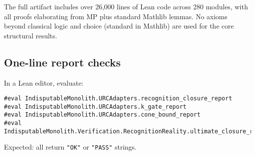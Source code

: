 \documentclass[11pt]{article}
\begin{document}
The full artifact includes over 26,000 lines of Lean code across 280 modules, with all proofs elaborating from MP plus standard Mathlib lemmas. No axioms beyond classical logic and choice (standard in Mathlib) are used for the core structural results.

\subsection*{One-line report checks}

In a Lean editor, evaluate:
\begin{verbatim}
#eval IndisputableMonolith.URCAdapters.recognition_closure_report
#eval IndisputableMonolith.URCAdapters.k_gate_report
#eval IndisputableMonolith.URCAdapters.cone_bound_report
#eval IndisputableMonolith.Verification.RecognitionReality.ultimate_closure_report
\end{verbatim}

Expected: all return \texttt{"OK"} or \texttt{"PASS"} strings.
\end{document}
